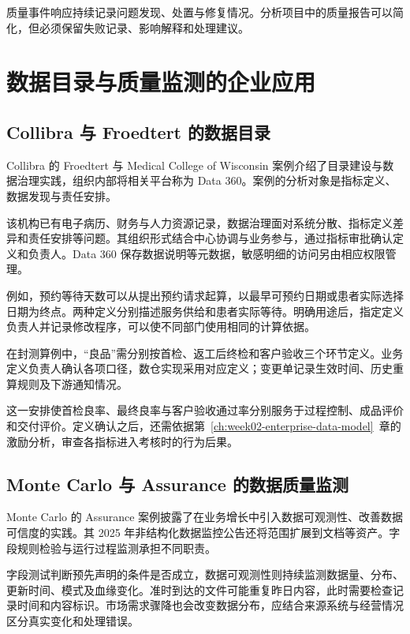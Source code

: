 质量事件响应持续记录问题发现、处置与修复情况。分析项目中的质量报告可以简化，但必须保留失败记录、影响解释和处理建议。

\section{数据目录与质量监测的企业应用}

\subsection{Collibra 与 Froedtert 的数据目录}
Collibra 的 Froedtert 与 Medical College of Wisconsin 案例介绍了目录建设与数据治理实践，组织内部将相关平台称为 Data 360\cite{collibra04,collibraGovernance}。案例的分析对象是指标定义、数据发现与责任安排。

该机构已有电子病历、财务与人力资源记录，数据治理面对系统分散、指标定义差异和责任安排等问题。其组织形式结合中心协调与业务参与，通过指标审批确认定义和负责人。Data 360 保存数据说明等元数据，敏感明细的访问另由相应权限管理。

例如，预约等待天数可以从提出预约请求起算，以最早可预约日期或患者实际选择日期为终点。两种定义分别描述服务供给和患者实际等待。明确用途后，指定定义负责人并记录修改程序，可以使不同部门使用相同的计算依据。

在封测算例中，“良品”需分别按首检、返工后终检和客户验收三个环节定义。业务定义负责人确认各项口径，数仓实现采用对应定义；变更单记录生效时间、历史重算规则及下游通知情况。

这一安排使首检良率、最终良率与客户验收通过率分别服务于过程控制、成品评价和交付评价。定义确认之后，还需依据第~\ref{ch:week02-enterprise-data-model}~章的激励分析，审查各指标进入考核时的行为后果。

\subsection{Monte Carlo 与 Assurance 的数据质量监测}
Monte Carlo 的 Assurance 案例披露了在业务增长中引入数据可观测性、改善数据可信度的实践\cite{monte04}。其 2025 年非结构化数据监控公告还将范围扩展到文档等资产\cite{unstructured04}。字段规则检验与运行过程监测承担不同职责。

字段测试判断预先声明的条件是否成立，数据可观测性则持续监测数据量、分布、更新时间、模式及血缘变化。准时到达的文件可能重复昨日内容，此时需要检查记录时间和内容标识。市场需求骤降也会改变数据分布，应结合来源系统与经营情况区分真实变化和处理错误。

